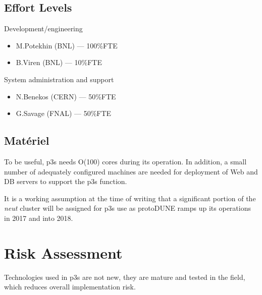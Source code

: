 \documentclass[pdftex,12pt,letter]{article}
\newcommand{\pd}{protoDUNE\xspace}
\begin{document}
\subsection{Effort Levels}

Development/engineering
\begin{itemize}
\item M.Potekhin (BNL) --- 100\%FTE
\item B.Viren (BNL) --- 10\%FTE
\end{itemize}

\noindent System administration and support

\begin{itemize}
\item N.Benekos (CERN) --- 50\%FTE
\item G.Savage (FNAL) --- 50\%FTE
\end{itemize}

\subsection{Mat\'eriel}
To be useful, p3s needs O(100) cores during its operation. In addition,
a small number of adequately configured machines are needed for
deployment of Web and DB servers to support the p3s function.

It is a working assumption at the time of writing that a significant portion of
the \textit{neut} cluster \cite{neut} will be assigned for p3s use as \pd ramps up
its operations in 2017 and into 2018.


\section{Risk Assessment}

Technologies used in p3s are not new, they are mature and tested in the field, which reduces
overall implementation risk.
\end{document}

